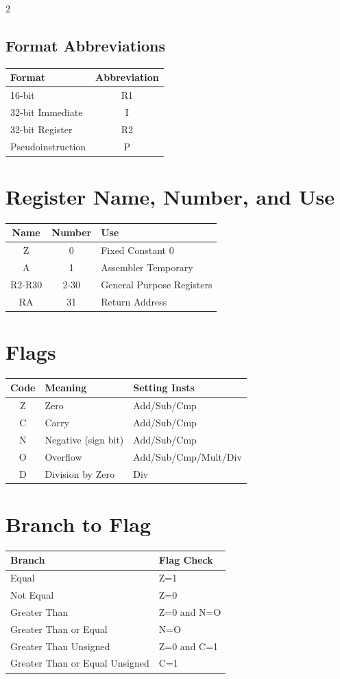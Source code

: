 \documentclass[a4paper,10pt]{article}
\begin{document}
\begin{multicols}{2}
\subsection*{Format Abbreviations}
\begin{tabular}{lc}
\toprule
Format & Abbreviation \\
\midrule
16-bit & R1 \\
32-bit Immediate & I \\
32-bit Register & R2 \\
Pseudoinstruction & P \\
\bottomrule
\end{tabular}

\section*{Register Name, Number, and Use}
\begin{tabular}{ccl}
\toprule
Name & Number & Use \\
\midrule
Z & 0 & Fixed Constant 0 \\
A & 1 & Assembler Temporary \\
R2-R30 & 2-30 & General Purpose Registers \\
RA & 31 & Return Address \\
\bottomrule
\end{tabular}

\section*{Flags}
\begin{tabular}{cll}
\toprule
Code & Meaning & Setting Insts\\
\midrule
Z & Zero & Add/Sub/Cmp\\
C & Carry & Add/Sub/Cmp\\
N & Negative (sign bit) & Add/Sub/Cmp\\
O & Overflow & Add/Sub/Cmp/Mult/Div\\
D & Division by Zero & Div\\
\bottomrule
\end{tabular}

\section*{Branch to Flag}
\begin{tabular}{ll}
\toprule
Branch & Flag Check\\
\midrule
Equal & Z=1 \\
Not Equal & Z=0 \\
Greater Than & Z=0 and N=O \\
Greater Than or Equal & N=O \\
Greater Than Unsigned &  Z=0 and C=1\\
Greater Than or Equal Unsigned &  C=1\\
\bottomrule
\end{tabular}


\end{multicols}
\end{document}
